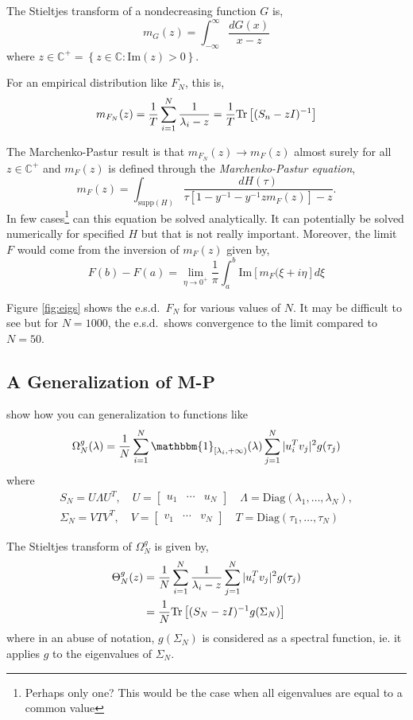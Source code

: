 \documentclass{article}
\begin{document}
The Stieltjes transform of a nondecreasing function $G$ is,
$$
	m_G(z) = \int_{-\infty}^\infty \frac{dG(x)}{x - z}
$$
where $z \in \mathbb{C}^+ = \left\{ z \in \mathbb{C}: \mathrm{Im}(z) >
0\right\}$.

For an empirical distribution like $F_N$, this is,
$$
	m_{F_N}(z)
		 = \frac1T \sum_{i=1}^N \frac{1}{\lambda_{i} - z}
		 = \frac1T \mathrm{Tr}\left[(S_n - zI)^{-1}\right]
$$

The Marchenko-Pastur result is that $m_{F_N}(z) \rightarrow m_{F}(z)$ almost
surely for all $z \in \mathbb{C}^+$ and $m_{F}(z)$ is defined through the \emph
{Marchenko-Pastur equation},
$$
	m_F(z) = \int_{\mathrm{supp}(H)}
			 \frac{dH(\tau)}{\tau\left[1 - y^{-1} - y^{-1}z m_F(z) \right] - z}.
$$
In few cases\footnote{Perhaps only one?  This would be the case when all
eigenvalues are equal to a common value} can this equation be solved
analytically.  It can potentially be solved numerically for specified $H$ but
that is not really important.  Moreover, the limit $F$ would come from the
inversion of $m_F(z)$ given by,
$$
	F(b) - F(a) = \lim_{\eta \rightarrow0^+} 
			\frac1\pi \int_a^b \mathrm{Im}\left[ m_F(\xi + i\eta\right] d\xi
$$

Figure \ref{fig:eigs} shows the e.s.d.\ $F_N$ for various values of $N$.  It may
be difficult to see but for $N=1000$, the e.s.d.\ shows convergence to the limit
compared to $N=50$.

\subsection{A Generalization of M-P}

\cite{Ledoit2011Eigenvectors} show how you can generalization to functions like
$$
	\Omega^g_N(\lambda)
		 = \frac{1}{N}\sum_{i=1}^N \mathbbm{1}_{[\lambda_{i}, +\infty)}(\lambda)
		 			\sum_{j=1}^N |u_i^T v_j|^2 g(\tau_j)
$$
where
\begin{gather*}
	S_N = U\Lambda U^T, 
		\quad U = \begin{bmatrix} u_1 & \cdots & u_N \end{bmatrix}
		\quad \Lambda = \mathrm{Diag}(\lambda_1, \ldots, \lambda_N),\\
	\Sigma_N = V T V^T, 
		\quad V = \begin{bmatrix} v_1 & \cdots & v_N \end{bmatrix}
		\quad T = \mathrm{Diag}(\tau_1, \ldots, \tau_N)
\end{gather*}

The Stieltjes transform of $\Omega^g_N$ is given by,
\begin{align*}
	\Theta^g_N(z)
		& = \frac{1}{N}\sum_{i=1}^N \frac{1}{\lambda_i - z}
		  		\sum_{j=1}^N |u_i^T v_j|^2 g(\tau_j) \\
		& = \frac{1}{N}\mathrm{Tr}\left[(S_N - zI)^{-1} g(\Sigma_N)\right]
\end{align*}
where in an abuse of notation, $g(\Sigma_N)$ is considered as a spectral
function, ie. it applies $g$ to the eigenvalues of $\Sigma_N$.
\end{document}
